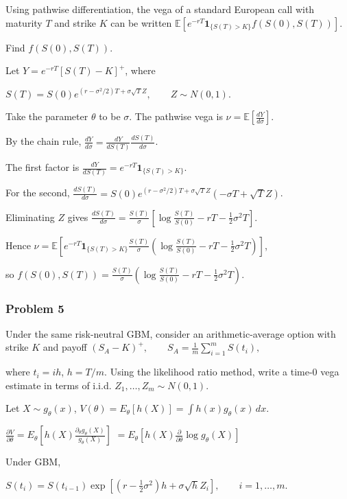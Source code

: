 Using pathwise differentiation, the vega of a standard European call with maturity $T$ and strike $K$ can be written
$\mathbb{E}\left[e^{-rT}\mathbf1_{\{S(T)>K\}}f(S(0),S(T))\right].$

Find $f(S(0),S(T))$.

 Let $Y=e^{-rT}[S(T)-K]^+$, where

$S(T)=S(0)e^{(r-\sigma^2/2)T+\sigma\sqrt T Z},\qquad Z\sim N(0,1)$.

Take the parameter $\theta$ to be $\sigma$. The pathwise vega is
$\nu=\mathbb{E}\left[\frac{dY}{d\sigma}\right]$.

By the chain rule,
$\frac{dY}{d\sigma}=\frac{dY}{dS(T)}\frac{dS(T)}{d\sigma}$.

The first factor is
$\frac{dY}{dS(T)}=e^{-rT}\mathbf1_{\{S(T)>K\}}$.

For the second,
$\frac{dS(T)}{d\sigma}=S(0)e^{(r-\sigma^2/2)T+\sigma\sqrt T Z}(-\sigma T+\sqrt T Z)$.

Eliminating $Z$ gives
$\frac{dS(T)}{d\sigma}=\frac{S(T)}\sigma\left[\log\frac{S(T)}{S(0)}-rT-\frac12\sigma^2T\right]$.

Hence
$\nu=\mathbb{E}\left[e^{-rT}\mathbf1_{\{S(T)>K\}}\frac{S(T)}\sigma\left(\log\frac{S(T)}{S(0)}-rT-\frac12\sigma^2T\right)\right]$,

so
$f(S(0),S(T))=\frac{S(T)}\sigma\left(\log\frac{S(T)}{S(0)}-rT-\frac12\sigma^2T\right)$.

\subsubsection*{Problem 5}

 Under the same risk-neutral GBM, consider an arithmetic-average option with strike $K$ and payoff
$(S_A-K)^+,\qquad S_A=\frac1m\sum_{i=1}^mS(t_i),$

where $t_i=ih$, $h=T/m$. Using the likelihood ratio method, write a time-$0$ vega estimate in terms of i.i.d. $Z_1,\ldots,Z_m\sim N(0,1)$.

Let $X\sim g_\theta(x)$, $V(\theta)=E_\theta[h(X)]
=\int h(x)g_\theta(x)\,dx$. 

$
\frac{\partial V}{\partial\theta}
=
E_\theta\left[
h(X)
\frac{\partial_\theta g_\theta(X)}
{g_\theta(X)}
\right]
$
$
=
E_\theta\left[
h(X)
\frac{\partial}{\partial\theta}\log g_\theta(X)
\right]
$

Under GBM,

$S(t_i)=S(t_{i-1})\exp\left[\left(r-\frac12\sigma^2\right)h+\sigma\sqrt hZ_i\right],\qquad i=1,\ldots,m$.

